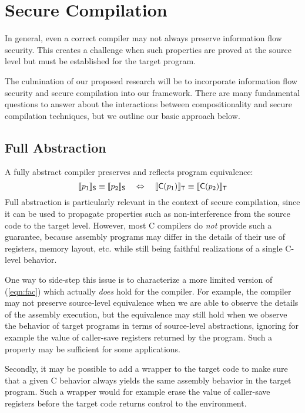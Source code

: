 \section{Secure Compilation}
\label{sec:security}

In general,
even a correct compiler may not always preserve
information flow security.
This creates a challenge when such properties
are proved at the source level
but must be established for the target program.

The culmination of our proposed research will be to incorporate
information flow security and secure compilation
into our framework.
There are many fundamental questions to answer
about the interactions between compositionality
and secure compilation techniques,
but we outline our basic approach below.

\subsection{Full Abstraction}

A fully abstract compiler preserves and reflects program equivalence:
\begin{equation} \label{eqn:fac}
  \llbracket p_1 \rrbracket_{ \mathsf{S} } \equiv
  \llbracket p_2 \rrbracket_{ \mathsf{S} }
  \quad \Leftrightarrow \quad
  \llbracket  \mathsf{C} (p_1) \rrbracket_{ \mathsf{T} } \equiv
  \llbracket  \mathsf{C} (p_2) \rrbracket_{ \mathsf{T} }
\end{equation}
Full abstraction is particularly relevant
in the context of secure compilation,
since it can be used to propagate properties such as non-interference
from the source code to the target level.
However,
most C compilers do \emph{not} provide such a guarantee,
because assembly programs may differ in the details
of their use of registers, memory layout, etc.
while still being faithful realizations of a single C-level behavior.

One way to side-step this issue
is to characterize a more limited version of (\ref{eqn:fac})
which actually \emph{does} hold for the compiler.
For example,
the compiler may not preserve source-level equivalence
when we are able to observe the details of the assembly execution,
but the equivalence may still hold when
we observe the behavior of target programs
in terms of source-level abstractions,
ignoring for example the value of caller-save registers
returned by the program.
Such a property may be sufficient for some applications.

Secondly,
it may be possible to add a wrapper to the target code
to make sure that a given C behavior always yields
the same assembly behavior in the target program.
Such a wrapper would for example
erase the value of caller-save registers
before the target code returns control to the environment.

